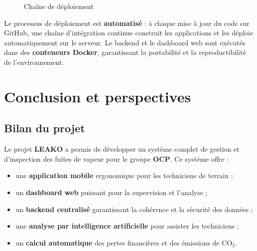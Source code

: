 \documentclass[12pt,a4paper,oneside]{report}
\begin{document}
\begin{figure}[H]
\centering
{}
\caption{Chaîne de déploiement}
\end{figure}

Le processus de déploiement est \textbf{automatisé} : à chaque mise à jour du code sur GitHub, une chaîne d'intégration continue construit les applications et les déploie automatiquement sur le serveur. Le backend et le dashboard web sont exécutés dans des \textbf{conteneurs Docker}, garantissant la portabilité et la reproductibilité de l'environnement.

\chapter{Conclusion et perspectives}

\section{Bilan du projet}

Le projet \textbf{LEAKO} a permis de développer un système complet de gestion et d'inspection des fuites de vapeur pour le groupe \textbf{OCP}. Ce système offre :
\begin{itemize}
    \item une \textbf{application mobile} ergonomique pour les techniciens de terrain ;
    \item un \textbf{dashboard web} puissant pour la supervision et l'analyse ;
    \item un \textbf{backend centralisé} garantissant la cohérence et la sécurité des données ;
    \item une \textbf{analyse par intelligence artificielle} pour assister les techniciens ;
    \item un \textbf{calcul automatique} des pertes financières et des émissions de CO$_2$.
\end{itemize}
\end{document}
